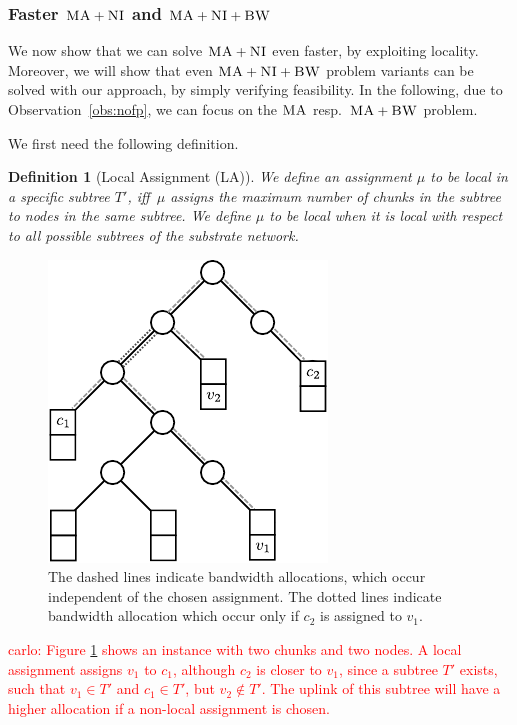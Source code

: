 \documentclass[9pt]{sigcomm-alternate}
\newcommand{\carlo}[1]{\textcolor{red}{carlo: #1}}
\newcommand{\VmChunkAssignment}{\mu}
\newcommand{\CC}{\textsc{NI}}
\newcommand{\BW}{\textsc{BW}}
\newcommand{\MA}{\textsc{MA}}
\newtheorem{defn}{Definition}
\newcommand{\Tree}{\ensuremath{T}}
\begin{document}
\subsubsection{Faster $\MA+\CC$ and $\MA+\CC+\BW$}

We now show that we can solve $\MA+\CC$ even faster, by exploiting
locality. Moreover, we will show that
even
$\MA+\CC+\BW$ problem variants can be solved with our approach, by simply
verifying feasibility.
In the following, due to Observation~\ref{obs:nofp}, we can focus on 
the $\MA$ resp.~$\MA+\BW$ problem.

We first need the following definition.
\begin{defn}[Local Assignment (LA)]\label{def:loc}
We define an assignment $\VmChunkAssignment$ to
be \emph{local in a specific subtree $\Tree'$}, iff~$\VmChunkAssignment$
assigns the maximum number of chunks in the
subtree to nodes in the same subtree.
We define $\VmChunkAssignment$ to be \emph{local} when
it is local with respect to all possible subtrees of the substrate network.
\end{defn}

\begin{figure}
\center
\includegraphics[width = 0.6\columnwidth]{figs/unbalanced_tree}
\caption{The dashed lines indicate bandwidth allocations, which occur 
independent of the chosen assignment. The dotted lines indicate bandwidth 
allocation which occur only if $c_2$ is assigned to $v_1$.}
\label{fig:unbalanced_tree}
\end{figure}

\carlo{Figure \ref{fig:unbalanced_tree} shows an instance with two chunks and 
two nodes. A local assignment assigns $v_1$ to $c_1$, although $c_2$ is 
closer to $v_1$, since a subtree $T'$ exists, such that $v_1 \in T'$ and $c_1 
\in T'$, but $v_2 \notin T'$. The uplink of this subtree will have a higher 
allocation if a non-local assignment is chosen.}
\end{document}

